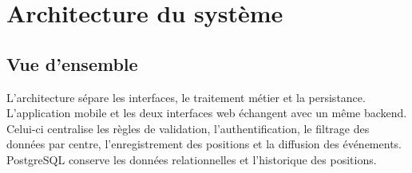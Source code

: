 \documentclass[11pt,a4paper,oneside]{report}
\begin{document}
\chapter{Architecture du système}

\section{Vue d'ensemble}

L'architecture sépare les interfaces, le traitement métier et la persistance.
L'application mobile et les deux interfaces web échangent avec un même backend.
Celui-ci centralise les règles de validation, l'authentification, le filtrage
des données par centre, l'enregistrement des positions et la diffusion des
événements. PostgreSQL conserve les données relationnelles et l'historique des
positions.
\end{document}
